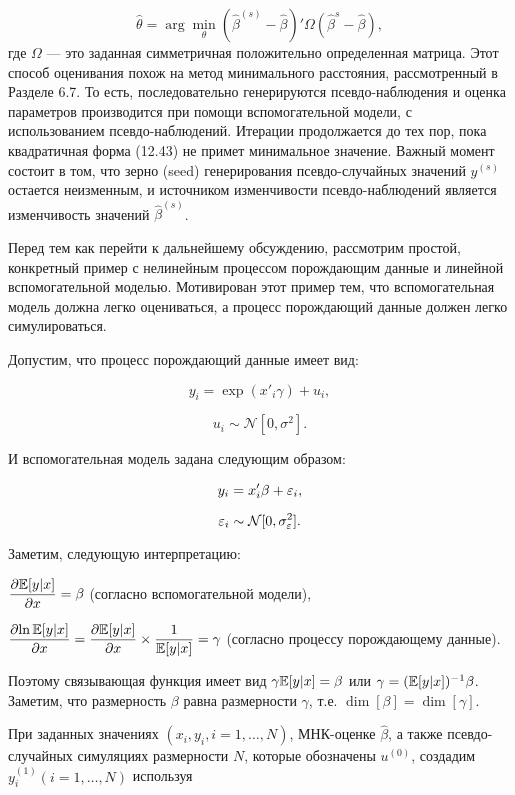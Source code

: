 \begin{equation}
\hat{\theta}=\arg \min_{\theta}(\hat{\beta}^{(s)}-\hat{\beta})'\Omega(\hat{\beta}^{s}-\hat{\beta}),
\end{equation}
где $\Omega$ --- это заданная симметричная положительно определенная матрица. Этот способ оценивания похож на метод минимального расстояния, рассмотренный в Разделе 6.7. То есть, последовательно генерируются псевдо-наблюдения и оценка параметров производится при помощи вспомогательной модели, с использованием псевдо-наблюдений. Итерации продолжается до тех пор, пока квадратичная форма (12.43) не примет минимальное значение. Важный момент состоит в том, что зерно (seed) генерирования псевдо-случайных значений $y^{(s)}$ остается неизменным, и источником изменчивости псевдо-наблюдений  является изменчивость значений $\hat{\beta}^{(s)}$. 

Перед тем как перейти к дальнейшему обсуждению, рассмотрим простой, конкретный пример с нелинейным процессом порождающим данные и линейной вспомогательной моделью. Мотивирован этот пример тем, что вспомогательная модель должна легко оцениваться, а процесс порождающий данные должен легко симулироваться.

Допустим, что процесс порождающий данные имеет вид:

\begin{equation}
y_i=\exp(x'_{i}\gamma)+u_i,
\end{equation}

\[
u_{i} \sim \mathcal{N}[0,\sigma^2].
\]

И вспомогательная модель задана следующим образом: 

\begin{equation}
y_i=x'_{i}\beta+\varepsilon_i,
\end{equation}

\[
\varepsilon_i\sim \mathcal{N}[0,\sigma^{2}_{\varepsilon}].
\]

Заметим, следующую интерпретацию:

$\dfrac{\partial{\mathbb{E}[y|x]}}{\partial{x}}=\beta$ (согласно вспомогательной модели),

$\dfrac{\partial{\ln{\mathbb{E}[y|x]}}}{\partial{x}}=\dfrac{\partial{\mathbb{E}[y|x]}}{\partial{x}}\times \dfrac{1}{\mathbb{E}[y|x]}=\gamma$ (согласно процессу порождающему данные).

Поэтому связывающая функция имеет вид $\gamma{\mathbb{E}[y|x]}=\beta$ или $\gamma=(\mathbb{E}[y|x])^{-1}\beta$. Заметим, что размерность $\beta$ равна размерности $\gamma$, т.е. $\dim[\beta]=\dim[\gamma]$.

При заданных значениях $(x_i,y_i,i=1,\ldots ,N)$, МНК-оценке $\hat{\beta}$, а также псевдо-случайных симуляциях размерности $N$, которые обозначены $u^{(0)}$, создадим $y^{(1)}_i(i=1,\ldots ,N)$ используя

